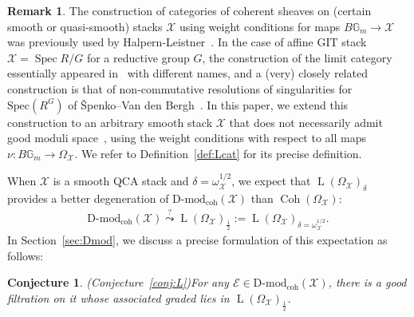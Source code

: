 \documentclass [11pt,oneside,a4paper,mathscr]{amsart}
\newtheorem{conj}[thm]{Conjecture}
\theoremstyle{definition}
\newtheorem{remark}[thm]{Remark}
\newcommand{\LL}{\operatorname{L}}
\newcommand{\X}{\mathcal{X}}
\newcommand{\bgm}{B\mathbb{G}_m}
\newcommand{\Coh}{\operatorname{Coh}}
\newcommand{\Spec}{\operatorname{Spec}}
\begin{document}
\begin{remark}
The construction of categories of coherent sheaves on (certain smooth or quasi-smooth) stacks $\mathcal{X}$ using weight conditions for maps $\bgm\to\mathcal{X}$ was previously used by Halpern-Leistner~\cite{HalpTheta, HalpK32}.
In the case of affine GIT stack $\X=\Spec R/G$ for a reductive group $G$, the construction 
of the limit category essentially appeared in~\cite{hls, PTquiver} with different names, and a (very) closely related construction is that of non-commutative resolutions of singularities for $\text{Spec}(R^G)$ of \v{S}penko--Van den Bergh~\cite{SvdB}. 
In this paper, we extend this construction to an arbitrary smooth stack $\X$ that does not necessarily admit 
good moduli space~\cite{MR3237451}, using the weight conditions with respect to 
all maps $
    \nu \colon \bgm \to \Omega_{\X}$. 
    We refer to Definition~\ref{def:Lcat} for its precise definition. 
    \end{remark}
    
    When $\X$ is a smooth QCA stack and $\delta=\omega_{\X}^{1/2}$, we 
expect that $\LL(\Omega_{\X})_{\delta}$ provides a better degeneration of 
$\text{D-mod}_{\mathrm{coh}}(\X)$ than $\Coh(\Omega_\X)$:
\begin{align*}
    \text{D-mod}_{\mathrm{coh}}(\X) \stackrel{?}{\leadsto} \LL(\Omega_{\X})_{\frac{1}{2}}:=\LL(\Omega_{\X})_{\delta=\omega_{\X}^{1/2}}. 
\end{align*}
In Section~\ref{sec:Dmod}, we discuss a precise formulation of this expectation 
as follows: 
\begin{conj}\emph{(Conjecture~\ref{conj:L})}\label{conj:L2}
    For any $\mathcal{E}\in \mathrm{D}\text{-}\mathrm{mod}_{\mathrm{coh}}(\X)$, there is a good filtration on 
    it whose associated graded lies in $\LL(\Omega_{\X})_{\frac{1}{2}}$.
\end{conj}
\end{document}
